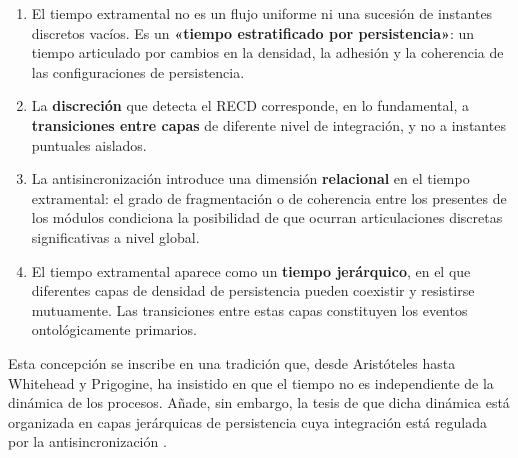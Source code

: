 \begin{enumerate}
    \item El tiempo extramental no es un flujo uniforme ni una sucesión de instantes discretos vacíos. Es un \textbf{«tiempo estratificado por persistencia»}: un tiempo articulado por cambios en la densidad, la adhesión y la coherencia de las configuraciones de persistencia.
    
    \item La \textbf{discreción} que detecta el RECD corresponde, en lo fundamental, a \textbf{transiciones entre capas} de diferente nivel de integración, y no a instantes puntuales aislados.
    
    \item La antisincronización introduce una dimensión \textbf{relacional} en el tiempo extramental: el grado de fragmentación o de coherencia entre los presentes de los módulos condiciona la posibilidad de que ocurran articulaciones discretas significativas a nivel global.
    
    \item El tiempo extramental aparece como un \textbf{tiempo jerárquico}, en el que diferentes capas de densidad de persistencia pueden coexistir y resistirse mutuamente. Las transiciones entre estas capas constituyen los eventos ontológicamente primarios.
\end{enumerate}

Esta concepción se inscribe en una tradición que, desde Aristóteles hasta Whitehead y Prigogine, ha insistido en que el tiempo no es independiente de la dinámica de los procesos. Añade, sin embargo, la tesis de que dicha dinámica está organizada en capas jerárquicas de persistencia cuya integración está regulada por la antisincronización \citep{padilla_polo_dialogue_2026}.